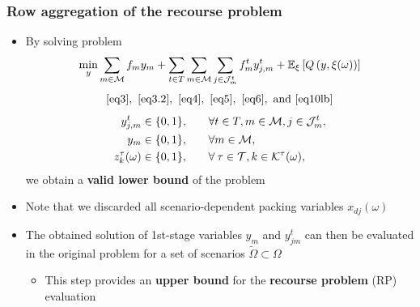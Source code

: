 \documentclass[9pt,xcolor={dvipsnames}]{beamer}
\begin{document}
\begin{frame}[allowframebreaks]
	\frametitle{Row aggregation of the recourse problem}
	\begin{itemize}
		\item By solving problem
		{
		\footnotesize
		\begin{equation*}
		\min_{y} \sum\limits_{m \in \cal M} {f_{m}}y_{m} +  \sum\limits_{t \in T} \sum\limits_{m \in {{\cal M}}} \sum\limits_{j \in {\cal J}_{m}^t} f_{m}^t y_{j,m}^t  + {\mathbb{E}}_{\xi}\left[Q \left(y,\xi(\omega)\right)\right] 
		\end{equation*}
		\begin{equation*}
			\eqref{eq3},~\eqref{eq3.2},~\eqref{eq4},~\eqref{eq5},~\eqref{eq6},~\text{and}~\eqref{eq10lb}
		\end{equation*}
		\begin{alignat*}{2}
		y_{j,m}^t \in \{0, 1\}, & \qquad \forall t \in T, m \in {\cal M}, j \in {\cal J}^t_{m}, \\
		y_{m} \in \{0, 1\}, & \qquad \forall m \in \cal M, \\
		z_k^{\tau}(\omega) \in \{0, 1\}, & \qquad \forall \: \tau \in {\cal T}, k \in {\cal K}^{\tau}(\omega),
		\end{alignat*}
		}
		we obtain a \textbf{valid lower bound} of the problem
		\bigskip
		\item Note that we discarded all scenario-dependent packing variables $ x_{dj}(\omega)$
		\bigskip
		\item The obtained solution of 1st-stage variables $ y_m$ and $y^t_{jm}$ can then be evaluated in the original problem for a set of scenarios $ \tilde{\Omega} \subset \Omega$
		\begin{itemize}
			\item This step provides an \textbf{upper bound} for the \textbf{recourse problem} (RP) evaluation
		\end{itemize}
	\end{itemize}
\end{frame}
\end{document}
